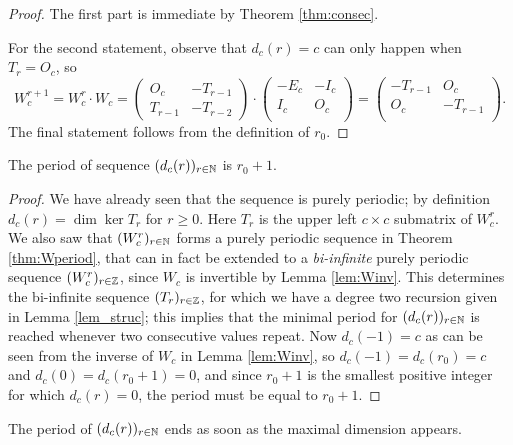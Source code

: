 \begin{proof}
The first part is immediate by Theorem \ref{thm:consec}.

For the second statement, observe that $d_c(r)=c$ can only happen
when $T_r=O_c$, so
  $$W_{c}^{r+1} = W_c^r\cdot W_c=
\left(\begin{matrix} O_c & -T_{r-1} \\ T_{r-1} & -T_{r-2}\end{matrix}\right)\cdot
\left(\begin{matrix} -E_{c} & -I_c \\ I_{c} & O_c \\\end{matrix}\right)=
\left(\begin{matrix} -T_{r-1} & O_c \\ O_c & -T_{r-1} \\\end{matrix}
\right).$$
The final statement follows from the definition of $r_0$.
\end{proof}
\begin{corollary}
The period of sequence $(d_c(r))_{r\in\mathbb{N}}$ is $r_0+1$.
\end{corollary}
\begin{proof}
We have already seen that the sequence is purely periodic; by definition
	$d_c(r)=\dim\ker T_r$ for $r\geq 0$. Here $T_r$ is the upper left
	$c\times c$ submatrix of $W_c^r$. We also saw that
	$(W_c^r)_{r\in\mathbb{N}}$ forms a purely periodic sequence in 
	Theorem \ref{thm:Wperiod}, that can in fact be
	extended to a {\it bi-infinite} purely periodic
	sequence $(W_c^r)_{r\in\mathbb{Z}}$, since $W_c$ is invertible by 
	Lemma \ref{lem:Winv}.
	This determines the bi-infinite sequence $(T_r)_{r\in\mathbb{Z}}$, for which
	we have a degree two recursion given in Lemma \ref{lem_struc}; 
	this implies that the minimal
	period for $(d_c(r))_{r\in\mathbb{N}}$ is reached whenever two consecutive 
	values repeat. Now $d_c(-1)=c$ as can be seen from the inverse of $W_c$
	in Lemma \ref{lem:Winv}, so $d_c(-1)=d_c(r_0)=c$ and 
	$d_c(0)=d_c(r_0+1)=0$,
	and since $r_0+1$ is the smallest positive integer for which $d_c(r)=0$,
	the period must be equal to $r_0+1$.
\end{proof}

\begin{theorem}[Observation 4]
The period of $(d_{c}(r))_{r\in\mathbb{N}}$ ends as soon as
	the maximal dimension appears.
\end{theorem}

